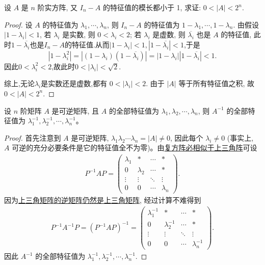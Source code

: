 \documentclass[../../main.tex]{subfiles}%
\begin{document}
\begin{example}
设 \( A \) 是 \( n \) 阶实方阵, 又 \( I_n - A \) 的特征值的模长都小于 1, 求证: \( 0 < |A| < 2^n \).
\end{example}
\begin{proof}
设 \( A \) 的特征值为 \( \lambda_1, \cdots, \lambda_n \), 则 \( I_n - A \) 的特征值为 \( 1 - \lambda_1, \cdots, 1 - \lambda_n \).
由假设 \( |1 - \lambda_i| < 1 \), 若 \( \lambda_i \) 是实数, 则 \( 0 < \lambda_i < 2 \); 若 \( \lambda_i \) 是虚数, 则 \( \overline{\lambda_i} \) 也是 \( A \) 的特征值, 此时$1-\overline{\lambda_i}$也是$I_n-A$的特征值.从而$|1-\lambda_i|<1,|1-\overline{\lambda_i}|<1$,于是
\[|1-\lambda_i^2|=|(1-\lambda_i)(1-\overline{\lambda_i})|=|1-\lambda_i||1-\overline{\lambda_i}|<1.\]
因此$0<\lambda_i^2<2$,故此时$0<|\lambda_i|<\sqrt{2}$.

综上,无论$\lambda_i$是实数还是虚数,都有 \( 0 < |\lambda_i| < 2 \). 由于 \( |A| \) 等于所有特征值之积, 故 \( 0 < |A| < 2^n \).
\end{proof}

\begin{proposition}[逆矩阵的特征值]\label{proposition:逆矩阵的特征值}
设 $n$ 阶矩阵 $A$ 是可逆矩阵, 且 $A$ 的全部特征值为 $\lambda_1, \lambda_2, \cdots, \lambda_n$, 则 $A^{-1}$ 的全部特征值为 $\lambda_1^{-1}, \lambda_2^{-1}, \cdots, \lambda_n^{-1}$。
\end{proposition}
\begin{proof}
首先注意到 $A$ 是可逆矩阵, $\lambda_1 \lambda_2 \cdots \lambda_n = |A| \neq 0$, 因此每个 $\lambda_i \neq 0$ (事实上, $A$ 可逆的充分必要条件是它的特征值全不为零)。由\hyperref[theorem:复方阵必相似于上三角阵]{复方阵必相似于上三角阵}可设
\begin{align*}
P^{-1}AP = \begin{pmatrix}
\lambda_1 & * & \cdots & * \\
0 & \lambda_2 & \cdots & * \\
\vdots & \vdots & \ddots & \vdots \\
0 & 0 & \cdots & \lambda_n
\end{pmatrix}.
\end{align*}
因为\hyperref[proposition:上三角阵性质]{上三角矩阵的逆矩阵仍然是上三角矩阵}, 经过计算不难得到
\begin{align*}
P^{-1}A^{-1}P = (P^{-1}AP)^{-1} 
= \begin{pmatrix}
\lambda_1^{-1} & * & \cdots & * \\
0 & \lambda_2^{-1} & \cdots & * \\
\vdots & \vdots & \ddots & \vdots \\
0 & 0 & \cdots & \lambda_n^{-1}
\end{pmatrix}.
\end{align*}
因此 $A^{-1}$ 的全部特征值为 $\lambda_1^{-1}, \lambda_2^{-1}, \cdots, \lambda_n^{-1}$.
\end{proof}
\end{document}
